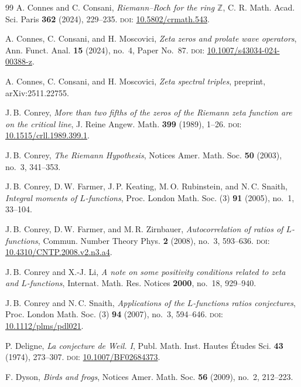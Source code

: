 \documentclass[11pt]{amsart}
\theoremstyle{definition}
\theoremstyle{remark}
\begin{document}
\begin{thebibliography}{99}
A. Connes and C. Consani,
\textit{Riemann--Roch for the ring $\mathbb{Z}$},
C. R. Math. Acad. Sci. Paris \textbf{362} (2024), 229--235.
\textsc{doi:} \href{https://doi.org/10.5802/crmath.543}{10.5802/crmath.543}.

A. Connes, C. Consani, and H. Moscovici,
\textit{Zeta zeros and prolate wave operators},
Ann. Funct. Anal. \textbf{15} (2024), no.~4, Paper No.~87.
\textsc{doi:} \href{https://doi.org/10.1007/s43034-024-00388-z}{10.1007/s43034-024-00388-z}.

A. Connes, C. Consani, and H. Moscovici,
\textit{Zeta spectral triples},
preprint, arXiv:2511.22755.

J.\,B. Conrey,
\textit{More than two fifths of the zeros of the Riemann zeta function are on the critical line},
J. Reine Angew. Math. \textbf{399} (1989), 1--26.
\textsc{doi:} \href{https://doi.org/10.1515/crll.1989.399.1}{10.1515/crll.1989.399.1}.

J.\,B. Conrey,
\textit{The Riemann Hypothesis},
Notices Amer. Math. Soc. \textbf{50} (2003), no.~3, 341--353.

J.\,B. Conrey, D.\,W. Farmer, J.\,P. Keating, M.\,O. Rubinstein, and N.\,C. Snaith,
\textit{Integral moments of $L$-functions},
Proc. London Math. Soc. (3) \textbf{91} (2005), no.~1, 33--104.

J.\,B. Conrey, D.\,W. Farmer, and M.\,R. Zirnbauer,
\textit{Autocorrelation of ratios of $L$-functions},
Commun. Number Theory Phys. \textbf{2} (2008), no.~3, 593--636.
\textsc{doi:} \href{https://doi.org/10.4310/CNTP.2008.v2.n3.a4}{10.4310/CNTP.2008.v2.n3.a4}.

J.\,B. Conrey and X.-J. Li,
\textit{A note on some positivity conditions related to zeta and $L$-functions},
Internat. Math. Res. Notices \textbf{2000}, no.~18, 929--940.

J.\,B. Conrey and N.\,C. Snaith,
\textit{Applications of the $L$-functions ratios conjectures},
Proc. London Math. Soc. (3) \textbf{94} (2007), no.~3, 594--646.
\textsc{doi:} \href{https://doi.org/10.1112/plms/pdl021}{10.1112/plms/pdl021}.

P. Deligne,
\textit{La conjecture de Weil. I},
Publ. Math. Inst. Hautes \'Etudes Sci. \textbf{43} (1974), 273--307.
\textsc{doi:} \href{https://doi.org/10.1007/BF02684373}{10.1007/BF02684373}.

F. Dyson,
\textit{Birds and frogs},
Notices Amer. Math. Soc. \textbf{56} (2009), no.~2, 212--223.


\end{thebibliography}
\end{document}
